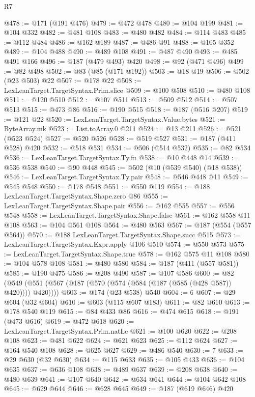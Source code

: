 \begin{lexlean}{R7}
\begin{coremodule}
@478 := @171 (@191 @476)
@479 := @472 @478
@480 := @104 @199
@481 := @104 @332
@482 := @481 @108
@483 := @480 @482
@484 := @114 @483
@485 := @112 @484
@486 := @162 @189
@487 := @486 @91
@488 := @105 @352
@489 := @104 @488
@490 := @489 @108
@491 := @487 @490
@493 := @485 @491 @166
@496 := @187 (@479 @493) @420
@498 := @92 (@471 @496)
@499 := @82 @498
@502 := @83 (@85 (@171 @192))
@503 := @18 @19
@506 := @502 (@23 @503) @22
@507 := @178 @22
@508 := LexLeanTarget.TargetSyntax.Prim.slice
@509 := @100 @508
@510 := @480 @108
@511 := @120 @510
@512 := @107 @511
@513 := @509 @512
@514 := @507 @513
@515 := @473 @86
@516 := @190 @515
@518 := @187 (@516 @207)
@519 := @121 @22
@520 := LexLeanTarget.TargetSyntax.Value.bytes
@521 := ByteArray.mk
@523 := List.toArray.{0} @211
@524 := @13 @211
@526 := @521 (@523 @524)
@527 := @520 @526
@528 := @519 @527
@531 := @187 (@411 @528) @420
@532 := @518 @531
@534 := @506 (@514 @532)
@535 := @82 @534
@536 := LexLeanTarget.TargetSyntax.Ty.fn
@538 := @10 @448 @14
@539 := @536 @538
@540 := @90 @448
@545 := @502 (@10 (@539 @540) (@18 @538))
@546 := LexLeanTarget.TargetSyntax.Ty.pair
@548 := @546 @448 @11
@549 := @545 @548
@550 := @178 @548
@551 := @550 @119
@554 := @188 LexLeanTarget.TargetSyntax.Shape.zero @86
@555 := LexLeanTarget.TargetSyntax.Shape.pair
@556 := @162 @555
@557 := @556 @548
@558 := LexLeanTarget.TargetSyntax.Shape.false
@561 := @162 @558 @11 @108
@563 := @104 @561 @108
@564 := @480 @563
@567 := @187 (@554 (@557 @564))
@570 := @188 LexLeanTarget.TargetSyntax.Shape.succ @515
@573 := LexLeanTarget.TargetSyntax.Expr.apply @106 @510
@574 := @550 @573
@575 := LexLeanTarget.TargetSyntax.Shape.true
@578 := @162 @575 @11 @108
@580 := @104 @578 @108
@581 := @480 @580
@584 := @187 (@411 (@557 @581))
@585 := @190 @475
@586 := @208 @490
@587 := @107 @586
@600 := @82 (@549 (@551 (@567 (@187 (@570 (@574 (@584 (@187 (@585 (@428 @587)) @420)))) @420))))
@603 := @174 (@23 @538) @540
@604 := 6
@607 := @29 @604 (@32 @604)
@610 := @603 (@115 @607 @183)
@611 := @82 @610
@613 := @178 @540 @119
@615 := @84 @433 @86
@616 := @474 @615
@618 := @191 (@473 @616)
@619 := @472 @618
@620 := LexLeanTarget.TargetSyntax.Prim.natLe
@621 := @100 @620
@622 := @208 @108
@623 := @481 @622
@624 := @621 @623
@625 := @112 @624
@627 := @164 @540 @108
@628 := @625 @627
@629 := @486 @540
@630 := 7
@633 := @29 @630 (@32 @630)
@634 := @115 @633
@635 := @105 @433
@636 := @104 @635
@637 := @636 @108
@638 := @489 @637
@639 := @208 @638
@640 := @480 @639
@641 := @107 @640
@642 := @634 @641
@644 := @104 @642 @108
@645 := @629 @644
@646 := @628 @645
@649 := @187 (@619 @646) @420

\end{coremodule}
\end{lexlean}
